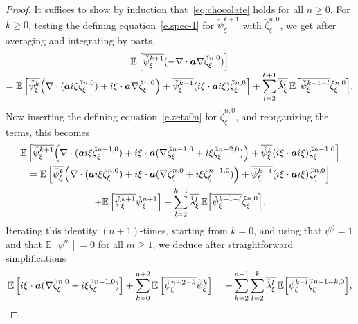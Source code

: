 \documentclass[10pt]{amsart}
\theoremstyle{plain}
\theoremstyle{definition}
\numberwithin{equation}{section}
\newcommand{\Aa}{\boldsymbol a}
\newcommand{\expec}[1]{\mathbb{E}\left[ #1 \right]}
\newcommand{\Bexpec}[1]{\mathbb{E}\Bigl[ #1 \Bigr]}
\begin{document}
\begin{proof}
It suffices to show by induction that~\eqref{eq:chocolate} holds for all $n\ge0$.
For $k\ge0$, testing the defining equation~\eqref{e.spec-1} for $\check\psi^{k+1}_\xi$ with $\check\zeta^{n,0}_\xi$, we get after averaging and integrating by parts,\vspace*{-3pt}
\begin{multline*}
\expec{\overline{\check \psi^{k+1}_\xi} (-\nabla \cdot \Aa \nabla \check\zeta^{n,0}_\xi)}\\[-3pt]
= \expec{\overline{\check\psi^k_\xi} \Big(\nabla \cdot (\Aa i \xi \check\zeta_\xi^{n,0})+i \xi \cdot \Aa\nabla \check\zeta_\xi^{n,0}\Big) +\overline{\check \psi_\xi^{k-1}}(i\xi \cdot\Aa i\xi)\check \zeta_\xi^{n,0}}
+\sum_{l=2}^{k+1}\overline{\check \lambda_\xi^l}\,\Bexpec{\overline{\check \psi_\xi^{k+1-l}}\check\zeta_\xi^{n,0}}.
\end{multline*}
Now inserting the defining equation~\eqref{e.zeta0n} for $\check\zeta_\xi^{n,0}$, and reorganizing the terms, this becomes\vspace*{-3pt}
\begin{multline*}
\expec{\overline{\check \psi_\xi^{k+1}} \Big(\nabla\cdot(\Aa i\xi\check\zeta_\xi^{n-1,0})+i\xi\cdot\Aa(\nabla\check\zeta_\xi^{n-1,0}+i\xi\check\zeta_\xi^{n-2,0})\Big)
+\overline{\check\psi_\xi^k} (i \xi \cdot \Aa i\xi)\check\zeta_\xi^{n-1,0} }\\
= \expec{\overline{\check\psi_\xi^k} \Big(\nabla \cdot (\Aa i \xi \check\zeta_\xi^{n,0})+ i \xi \cdot \Aa(\nabla \check\zeta_\xi^{n,0}+i\xi\check\zeta_\xi^{n-1,0})\Big)
+\overline{\check \psi_\xi^{k-1}}(i\xi \cdot\Aa i\xi)\check \zeta_\xi^{n,0}}\\
+\expec{\overline{\check \psi_\xi^{k+1}}\check\psi_\xi^{n+1}}
+\sum_{l=2}^{k+1}\overline{\check \lambda_\xi^l}\,\Bexpec{ \overline{\check \psi_\xi^{k+1-l}}\check\zeta_\xi^{n,0}}.
\end{multline*}
Iterating this identity $(n+1)$-times, starting from $k=0$, and using that $\psi^0=1$ and that $\expec{\psi^m}=0$ for all $m\geq 1$, we deduce after straightforward simplifications\vspace*{-3pt}
\begin{equation*}
\expec{i\xi \cdot \Aa(\nabla \check\zeta_\xi^{n,0}+i\xi\check\zeta_\xi^{n-1,0})}+\sum_{k=0}^{n+2}\expec{\overline{\check \psi_\xi^{n+2-k}}\check\psi_\xi^{k}}
=-\sum_{k=2}^{n+1}\sum_{l=2}^{k}\overline{\check \lambda_\xi^l}\,\Bexpec{ \overline{\check \psi_\xi^{k-l}}\check\zeta_\xi^{n+1-k,0}},
\end{equation*}

\end{proof}
\end{document}

